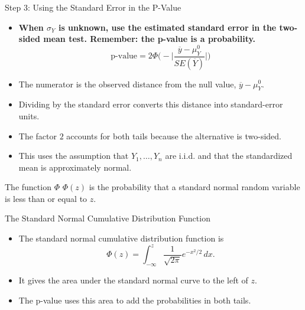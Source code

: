 \documentclass[notes,10pt, aspectratio=169]{beamer}
\begin{document}
\begin{frame}{Step 3: Using the Standard Error in the P-Value}
\begin{itemize}
\item \textbf{When $\sigma_Y$ is unknown, use the estimated standard error in the two-sided mean test. Remember: the p-value is a probability.}
    \begin{equation*}
        \text{p-value} = 2\Phi\biggl(-\bigg| \frac{\overline{y}-\mu_Y^0}{SE(\overline{Y})}\bigg|\biggl)
    \end{equation*}
    \item The numerator is the observed distance from the null value, $\overline{y}-\mu_Y^0$.
    \item Dividing by the standard error converts this distance into standard-error units.
    \item The factor $2$ accounts for both tails because the alternative is two-sided.
    \item This uses the assumption that $Y_1,\dots,Y_n$ are i.i.d. and that the standardized mean is approximately normal.
\end{itemize}
\begin{block}{The function $\Phi$}
    $\Phi(z)$ is the probability that a standard normal random variable is less than or equal to $z$.
\end{block}
\end{frame}

\begin{frame}{The Standard Normal Cumulative Distribution Function}
\begin{itemize}
    \item The standard normal cumulative distribution function is
    \[
        \Phi(z)=\int_{-\infty}^{z}
        \frac{1}{\sqrt{2\pi}}e^{-x^2/2}\,dx.
    \]
    \item It gives the area under the standard normal curve to the left of $z$.
    \item The p-value uses this area to add the probabilities in both tails.
\end{itemize}
\end{frame}
\end{document}

